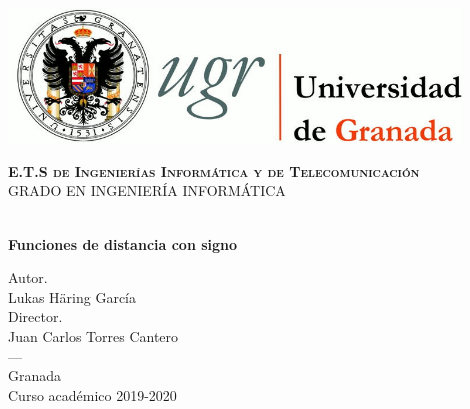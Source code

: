 \begin{titlepage}
\newlength{\centeroffset}
\setlength{\centeroffset}{-0.5\oddsidemargin}
\addtolength{\centeroffset}{0.5\evensidemargin}
\thispagestyle{empty}

\noindent\hspace*{\centeroffset}

	\includegraphics[width=0.9\textwidth]{logos/logo_ugr.jpg}\\[1.4cm]

	\begin{addmargin}[2.56cm]{0cm}
		\begin{minipage}{\textwidth}
			\textsc{\bfseries E.T.S de Ingenierías Informática y de Telecomunicación}\\
			
			\textsc{GRADO EN INGENIERÍA INFORMÁTICA}
			
			\vspace{3.0cm}
			
			\\[0.5cm]
			\begingroup
				\LARGE{\bfseries Funciones de distancia con signo}\\\bigskip
			\endgroup
	
			\vspace{3.0cm}
			
			\large{Autor.\\ Lukas Häring García}\\[0.4cm]
			\large{Director.\\ Juan Carlos Torres Cantero}\\[2cm]
			\textsc{---}\\
			Granada\\
			Curso académico 2019-2020
		\end{minipage}
	\end{addmargin}

\end{titlepage}
